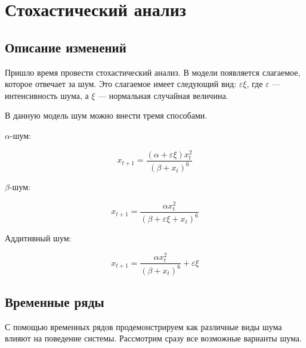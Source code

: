 \section{Стохастический анализ}

    \subsection{Описание изменений}

        Пришло время провести стохастический анализ. В модели появляется слагаемое, которое отвечает за шум. Это слагаемое имеет следующий вид: \(\varepsilon \xi\), где \(\varepsilon\) --- интенсивность шума, а \(\xi\) --- нормальная случайная величина.



        В данную модель шум можно внести тремя способами.

        \(\alpha\)-шум: 

        \begin{equation}
            \label{alpha_chaos}
            x_{t + 1} = \frac{(\alpha + \varepsilon \xi) x_t^2}{(\beta + x_t)^6}
        \end{equation}

        \(\beta\)-шум:

        \begin{equation}
            \label{beta_chaos}
            x_{t + 1} = \frac{\alpha x_t^2}{(\beta + \varepsilon \xi + x_t)^6}
        \end{equation}

        Аддитивный шум:

        \begin{equation}
            \label{additive_chaos}
            x_{t + 1} = \frac{\alpha x_t^2}{(\beta + x_t)^6} + \varepsilon \xi
        \end{equation}

    \subsection{Временные ряды}

        С помощью временных рядов продемонстрируем как различные виды шума влияют на поведение системы. Рассмотрим сразу все возможные варианты шума. 

